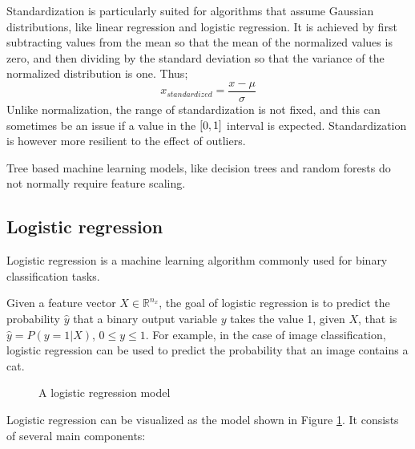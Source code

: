 \documentclass[conference]{IEEEtran}
\begin{document}
	Standardization is particularly suited for algorithms that assume Gaussian distributions, like linear regression and logistic regression. It is achieved by first subtracting values from the mean so that the mean of the normalized values is zero, and then dividing by the standard deviation so that the variance of the normalized distribution is one. Thus;
	$$
	x_{standardized} = \frac{x - \mu}{\sigma}
	$$
	Unlike normalization, the range of standardization is not fixed, and this can sometimes be an issue if a value in the $[0,\space 1]$ interval is expected.  Standardization is however more resilient to the effect of outliers.
	
	Tree based machine learning models, like decision trees and random forests do not normally require feature scaling.
	
	\subsection{Logistic regression}
	
	
	Logistic regression is a machine learning algorithm commonly used for binary classification tasks.
	
	Given a feature vector $X \in \mathbb{R}^{n_x}$, the goal of logistic regression is to predict the probability $\hat{y}$ that a binary output variable $y$ takes the value 1, given $X$, that is $\hat{y} = P(y=1|X)$, $0\le y\le1$. 
	For example, in the case of image classification, logistic regression can be used to predict the probability that an image contains a cat.

	\begin{figure}[H]
		\centering
		
		\caption{A logistic regression model}
		\label{fig:logisticregression}
	\end{figure}

	
	Logistic regression can be visualized as the model shown in Figure \ref{fig:logisticregression}. It consists of several main components:
	
\end{document}
